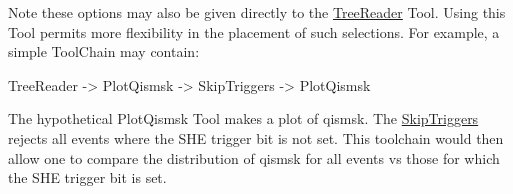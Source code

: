 Note these options may also be given directly to the \mbox{\hyperlink{classTreeReader}{Tree\+Reader}} Tool. Using this Tool permits more flexibility in the placement of such selections. For example, a simple Tool\+Chain may contain\+: \begin{DoxyVerb}TreeReader -> PlotQismsk -> SkipTriggers -> PlotQismsk
\end{DoxyVerb}
 The hypothetical Plot\+Qismsk Tool makes a plot of qismsk. The \mbox{\hyperlink{classSkipTriggers}{Skip\+Triggers}} rejects all events where the SHE trigger bit is not set. This toolchain would then allow one to compare the distribution of qismsk for all events vs those for which the SHE trigger bit is set. 